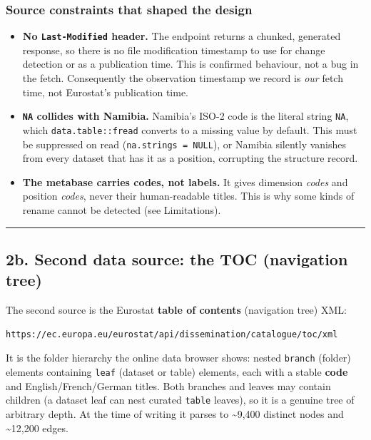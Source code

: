 \documentclass[
]{article}
\providecommand{\tightlist}{%
  \setlength{\itemsep}{0pt}\setlength{\parskip}{0pt}}
\begin{document}
\subsubsection{Source constraints that shaped the
design}\label{source-constraints-that-shaped-the-design}

\begin{itemize}
\tightlist
\item
  \textbf{No \texttt{Last-Modified} header.} The endpoint returns a
  chunked, generated response, so there is no file modification
  timestamp to use for change detection or as a publication time. This
  is confirmed behaviour, not a bug in the fetch. Consequently the
  observation timestamp we record is \emph{our} fetch time, not
  Eurostat's publication time.
\item
  \textbf{\texttt{NA} collides with Namibia.} Namibia's ISO-2 code is
  the literal string \texttt{NA}, which \texttt{data.table::fread}
  converts to a missing value by default. This must be suppressed on
  read (\texttt{na.strings\ =\ NULL}), or Namibia silently vanishes from
  every dataset that has it as a position, corrupting the structure
  record.
\item
  \textbf{The metabase carries codes, not labels.} It gives dimension
  \emph{codes} and position \emph{codes}, never their human-readable
  titles. This is why some kinds of rename cannot be detected (see
  Limitations).
\end{itemize}

\begin{center}\rule{0.5\linewidth}{0.5pt}\end{center}

\subsection{2b. Second data source: the TOC (navigation
tree)}\label{b.-second-data-source-the-toc-navigation-tree}

The second source is the Eurostat \textbf{table of contents} (navigation
tree) XML:

\begin{verbatim}
https://ec.europa.eu/eurostat/api/dissemination/catalogue/toc/xml
\end{verbatim}

It is the folder hierarchy the online data browser shows: nested
\texttt{branch} (folder) elements containing \texttt{leaf} (dataset or
table) elements, each with a stable \textbf{code} and
English/French/German titles. Both branches and leaves may contain
children (a dataset leaf can nest curated \texttt{table} leaves), so it
is a genuine tree of arbitrary depth. At the time of writing it parses
to \textasciitilde9,400 distinct nodes and \textasciitilde12,200 edges.
\end{document}
